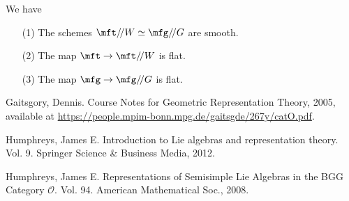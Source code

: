 	\begin{prop}[{\!\!\cite[Sect. 7]{G}}]
		We have
		\begin{itemize}
			\item[(1)]
				The schemes $ \mft/\!/W \simeq \mfg/\!/G$ are smooth.
			\item[(2)]
				The map $\mft \to  \mft/\!/W$ is flat.
			\item[(3)]
				The map $\mfg \to  \mfg/\!/G$ is flat.
		\end{itemize}
	\end{prop}


	
\begin{thebibliography}{Yau}

	 Gaitsgory, Dennis. Course Notes for Geometric Representation Theory, 2005, available at \url{https://people.mpim-bonn.mpg.de/gaitsgde/267y/catO.pdf}.

	 Humphreys, James E. Introduction to Lie algebras and representation theory. Vol. 9. Springer Science \& Business Media, 2012.

	 Humphreys, James E. Representations of Semisimple Lie Algebras in the BGG Category $\mathcal{O} $. Vol. 94. American Mathematical Soc., 2008.

\end{thebibliography}

 



